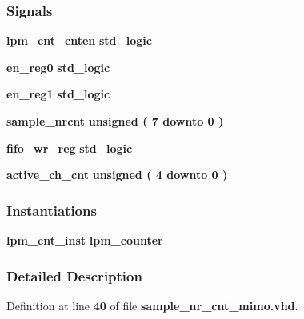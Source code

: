\subsubsection*{Signals}
 \begin{DoxyCompactItemize}
\item 
{\bf lpm\+\_\+cnt\+\_\+cnten} {\bfseries \textcolor{comment}{std\+\_\+logic}\textcolor{vhdlchar}{ }} 
\item 
{\bf en\+\_\+reg0} {\bfseries \textcolor{comment}{std\+\_\+logic}\textcolor{vhdlchar}{ }} 
\item 
{\bf en\+\_\+reg1} {\bfseries \textcolor{comment}{std\+\_\+logic}\textcolor{vhdlchar}{ }} 
\item 
{\bf sample\+\_\+nrcnt} {\bfseries \textcolor{comment}{unsigned}\textcolor{vhdlchar}{ }\textcolor{vhdlchar}{(}\textcolor{vhdlchar}{ }\textcolor{vhdlchar}{ } \textcolor{vhdldigit}{7} \textcolor{vhdlchar}{ }\textcolor{keywordflow}{downto}\textcolor{vhdlchar}{ }\textcolor{vhdlchar}{ } \textcolor{vhdldigit}{0} \textcolor{vhdlchar}{ }\textcolor{vhdlchar}{)}\textcolor{vhdlchar}{ }} 
\item 
{\bf fifo\+\_\+wr\+\_\+reg} {\bfseries \textcolor{comment}{std\+\_\+logic}\textcolor{vhdlchar}{ }} 
\item 
{\bf active\+\_\+ch\+\_\+cnt} {\bfseries \textcolor{comment}{unsigned}\textcolor{vhdlchar}{ }\textcolor{vhdlchar}{(}\textcolor{vhdlchar}{ }\textcolor{vhdlchar}{ } \textcolor{vhdldigit}{4} \textcolor{vhdlchar}{ }\textcolor{keywordflow}{downto}\textcolor{vhdlchar}{ }\textcolor{vhdlchar}{ } \textcolor{vhdldigit}{0} \textcolor{vhdlchar}{ }\textcolor{vhdlchar}{)}\textcolor{vhdlchar}{ }} 
\end{DoxyCompactItemize}
\subsubsection*{Instantiations}
 \begin{DoxyCompactItemize}
\item 
{\bf lpm\+\_\+cnt\+\_\+inst}  {\bfseries lpm\+\_\+counter}   
\end{DoxyCompactItemize}


\subsubsection{Detailed Description}


Definition at line {\bf 40} of file {\bf sample\+\_\+nr\+\_\+cnt\+\_\+mimo.\+vhd}.



